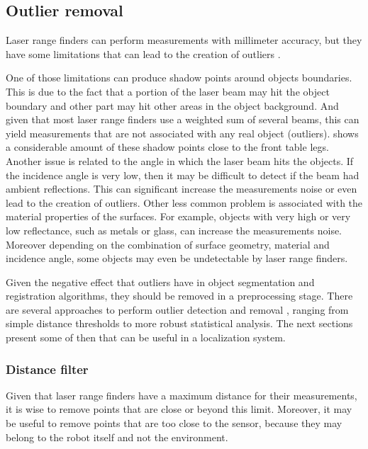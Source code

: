 \subsection{Outlier removal}

Laser range finders can perform measurements with millimeter accuracy, but they have some limitations that can lead to the creation of outliers \cite{Sotoodeh2006}.

One of those limitations can produce shadow points around objects boundaries. This is due to the fact that a portion of the laser beam may hit the object boundary and other part may hit other areas in the object background. And given that most laser range finders use a weighted sum of several beams, this can yield measurements that are not associated with any real object (outliers).  shows a considerable amount of these shadow points close to the front table legs. Another issue is related to the angle in which the laser beam hits the objects. If the incidence angle is very low, then it may be difficult to detect if the beam had ambient reflections. This can significant increase the measurements noise or even lead to the creation of outliers. Other less common problem is associated with the material properties of the surfaces. For example, objects with very high or very low reflectance, such as metals or glass, can increase the measurements noise. Moreover depending on the combination of surface geometry, material and incidence angle, some objects may even be undetectable by laser range finders.

Given the negative effect that outliers have in object segmentation and registration algorithms, they should be removed in a preprocessing stage. There are several approaches to perform outlier detection and removal \cite{YangZhang2010}, ranging from simple distance thresholds to more robust statistical analysis. The next sections present some of then that can be useful in a localization system.


\subsubsection{Distance filter}

Given that laser range finders have a maximum distance for their measurements, it is wise to remove points that are close or beyond this limit. Moreover, it may be useful to remove points that are too close to the sensor, because they may belong to the robot itself and not the environment.

